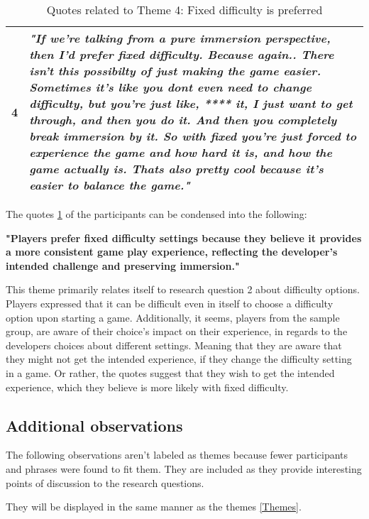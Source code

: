 \begin{table}[H]
\begin{tabular}{@{}c p{11cm}@{}}
\midrule

4 & \textit{"If we're talking from a pure immersion perspective, then I'd prefer fixed difficulty. Because again.. There isn't this possibilty of just making the game easier. Sometimes it's like you dont even need to change difficulty, but you're just like, **** it, I just want to get through, and then you do it. And then you completely break immersion by it. So with fixed you're just forced to experience the game and how hard it is, and how the game actually is. Thats also pretty cool because it's easier to balance the game."}\\

\bottomrule
\end{tabular}

\caption{Quotes related to Theme 4: Fixed difficulty is preferred}
\label{tab:theme4-quotes}
\end{table}

The quotes \ref{tab:theme4-quotes} of the participants can be condensed into the following:
\begin{center}
    \textbf{"Players prefer fixed difficulty settings because they believe it provides a more consistent game play experience, reflecting the developer's intended challenge and preserving immersion."}
\end{center}

This theme primarily relates itself to research question 2 about difficulty options. Players expressed that it can be difficult even in itself to choose a difficulty option upon starting a game. Additionally, it seems, players from the sample group, are aware of their choice's impact on their experience, in regards to the developers choices about different settings. Meaning that they are aware that they might not get the intended experience, if they change the difficulty setting in a game. Or rather, the quotes suggest that they wish to get the intended experience, which they believe is more likely with fixed difficulty. 

\subsection{Additional observations}
The following observations aren't labeled as themes because fewer participants and phrases were found to fit them. They are included as they provide interesting points of discussion to the research questions.

They will be displayed in the same manner as the themes \ref{Themes}.

